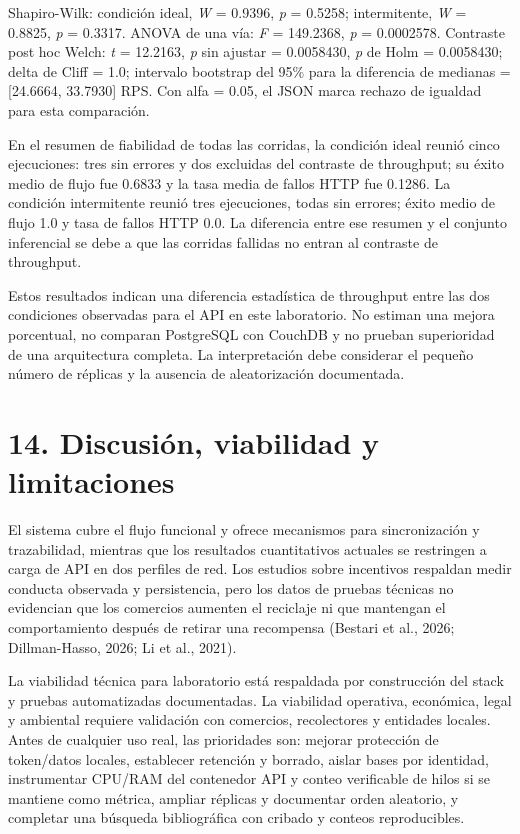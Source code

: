 \documentclass[
  spanish,
  12pt,
  a4paper,
]{article}
\begin{document}
Shapiro-Wilk: condición ideal, \emph{W} = 0.9396, \emph{p} = 0.5258;
intermitente, \emph{W} = 0.8825, \emph{p} = 0.3317. ANOVA de una vía:
\emph{F} = 149.2368, \emph{p} = 0.0002578. Contraste post hoc Welch:
\emph{t} = 12.2163, \emph{p} sin ajustar = 0.0058430, \emph{p} de Holm =
0.0058430; delta de Cliff = 1.0; intervalo bootstrap del 95\% para la
diferencia de medianas = {[}24.6664, 33.7930{]} RPS. Con alfa = 0.05, el
JSON marca rechazo de igualdad para esta comparación.

En el resumen de fiabilidad de todas las corridas, la condición ideal
reunió cinco ejecuciones: tres sin errores y dos excluidas del contraste
de throughput; su éxito medio de flujo fue 0.6833 y la tasa media de
fallos HTTP fue 0.1286. La condición intermitente reunió tres
ejecuciones, todas sin errores; éxito medio de flujo 1.0 y tasa de
fallos HTTP 0.0. La diferencia entre ese resumen y el conjunto
inferencial se debe a que las corridas fallidas no entran al contraste
de throughput.

Estos resultados indican una diferencia estadística de throughput entre
las dos condiciones observadas para el API en este laboratorio. No
estiman una mejora porcentual, no comparan PostgreSQL con CouchDB y no
prueban superioridad de una arquitectura completa. La interpretación
debe considerar el pequeño número de réplicas y la ausencia de
aleatorización documentada.

\section{14. Discusión, viabilidad y
limitaciones}\label{discusiuxf3n-viabilidad-y-limitaciones}

El sistema cubre el flujo funcional y ofrece mecanismos para
sincronización y trazabilidad, mientras que los resultados cuantitativos
actuales se restringen a carga de API en dos perfiles de red. Los
estudios sobre incentivos respaldan medir conducta observada y
persistencia, pero los datos de pruebas técnicas no evidencian que los
comercios aumenten el reciclaje ni que mantengan el comportamiento
después de retirar una recompensa (Bestari et al., 2026; Dillman-Hasso,
2026; Li et al., 2021).

La viabilidad técnica para laboratorio está respaldada por construcción
del stack y pruebas automatizadas documentadas. La viabilidad operativa,
económica, legal y ambiental requiere validación con comercios,
recolectores y entidades locales. Antes de cualquier uso real, las
prioridades son: mejorar protección de token/datos locales, establecer
retención y borrado, aislar bases por identidad, instrumentar CPU/RAM
del contenedor API y conteo verificable de hilos si se mantiene como
métrica, ampliar réplicas y documentar orden aleatorio, y completar una
búsqueda bibliográfica con cribado y conteos reproducibles.
\end{document}
